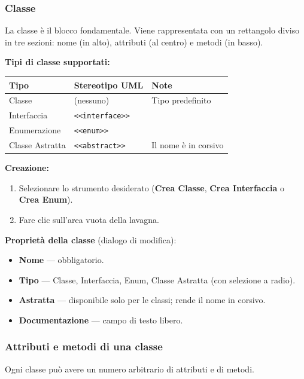 \documentclass[a4paper,11pt]{article}
\newcommand{\uielement}[1]{\textbf{#1}}
\begin{document}
\subsubsection{Classe}

La classe è il blocco fondamentale. Viene rappresentata con un rettangolo diviso in tre sezioni:
nome (in alto), attributi (al centro) e metodi (in basso).

\textbf{Tipi di classe supportati:}
\begin{center}
\begin{tabular}{@{}lll@{}}
  \toprule
  \textbf{Tipo} & \textbf{Stereotipo UML} & \textbf{Note} \\
  \midrule
  Classe          & (nessuno)         & Tipo predefinito \\
  Interfaccia     & \texttt{<<interface>>}   & \\
  Enumerazione    & \texttt{<<enum>>}        & \\
  Classe Astratta & \texttt{<<abstract>>}    & Il nome è in corsivo \\
  \bottomrule
\end{tabular}
\end{center}

\textbf{Creazione:}
\begin{enumerate}
  \item Selezionare lo strumento desiderato (\uielement{Crea Classe}, \uielement{Crea Interfaccia}
        o \uielement{Crea Enum}).
  \item Fare clic sull'area vuota della lavagna.
\end{enumerate}

\textbf{Proprietà della classe} (dialogo di modifica):
\begin{itemize}
  \item \textbf{Nome} --- obbligatorio.
  \item \textbf{Tipo} --- Classe, Interfaccia, Enum, Classe Astratta (con selezione a radio).
  \item \textbf{Astratta} --- disponibile solo per le classi; rende il nome in corsivo.
  \item \textbf{Documentazione} --- campo di testo libero.
\end{itemize}

\subsubsection{Attributi e metodi di una classe}

Ogni classe può avere un numero arbitrario di attributi e di metodi.
\end{document}
